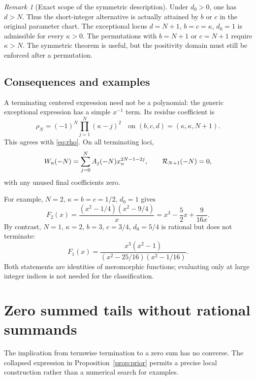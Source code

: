\documentclass[11pt,a4paper]{article}
\numberwithin{equation}{section}
\theoremstyle{definition}\newtheorem{definition}[theorem]{Definition}
\theoremstyle{remark}\newtheorem{remark}[theorem]{Remark}
\begin{document}
\begin{remark}[Exact scope of the symmetric description]
Under $d_0>0$, one has $d>N$. Thus the short-integer alternative is
actually attained by $b$ or $c$ in the original parameter chart.
The exceptional locus $d=N+1$, $b=c=\kappa$, $d_0=1$ is admissible
for every $\kappa>0$. The permutations with $b=N+1$ or $c=N+1$
require $\kappa>N$. The symmetric theorem is useful, but the
positivity domain must still be enforced after a permutation.
\end{remark}

\subsection{Consequences and examples}
A terminating centered expression need not be a polynomial: the generic
exceptional expression has a simple $x^{-1}$ term. Its residue coefficient
is
\begin{equation}
 \rho_N=(-1)^N\prod_{j=1}^N(\kappa-j)^2
 \quad\text{on }(b,c,d)=(\kappa,\kappa,N+1).
 \label{eq:rho-exceptional}
\end{equation}
This agrees with \eqref{eq:rho}. On all terminating loci,
\begin{equation}
 W_n(-N)=\sum_{j=0}^N A_j(-N)x_n^{2N-1-2j},\qquad
 \mathcal R_{N+1}(-N)=0,
 \label{eq:termwise-zero}
\end{equation}
with any unused final coefficients zero.

For example, $N=2$, $\kappa=b=c=1/2$, $d_0=1$ gives
\[
 F_2(x)=\frac{(x^2-1/4)(x^2-9/4)}x
       =x^3-\frac52x+\frac9{16x}.
\]
By contrast, $N=1$, $\kappa=2$, $b=3$, $c=3/4$, $d_0=5/4$
is rational but does not terminate:
\[
 F_1(x)=\frac{x^3(x^2-1)}{(x^2-25/16)(x^2-1/16)}.
\]
Both statements are identities of meromorphic functions; evaluating only
at large integer indices is not needed for the classification.

\section{Zero summed tails without rational summands}
\label{sec:zero-curves}
The implication from termwise termination to a zero sum has no converse.
The collapsed expression in Proposition~\ref{prop:prior} permits a precise
local construction rather than a numerical search for examples.
\end{document}
